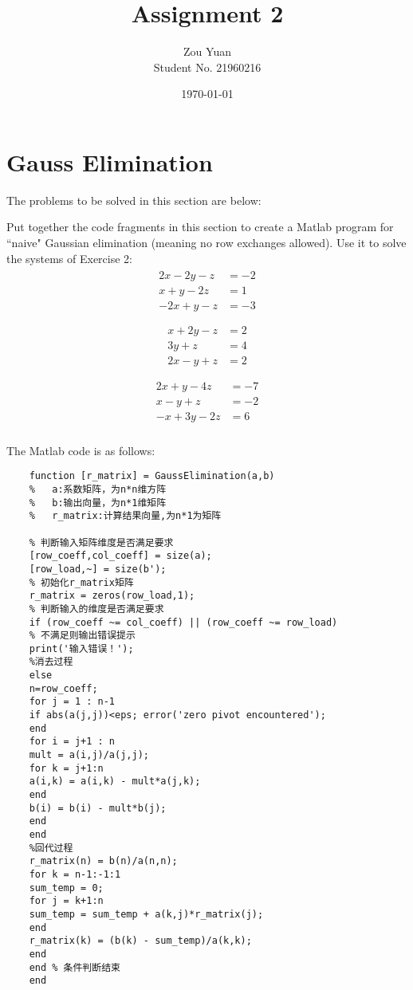 \documentclass[UTF8]{ctexart}
\title{Assignment 2}  %
\author{Zou Yuan\\Student No. 21960216}   %
\date{\today}       %
\begin{document}
	\maketitle
	\section{Gauss Elimination}
	The problems to be solved in this section are below:
	
	Put together the code fragments in this section to create a Matlab program for “naive"
	Gaussian elimination (meaning no row exchanges allowed). Use it to solve the systems of
	Exercise 2:
	\begin{align}
	\begin{split}
	2x − 2y − z &=−2\\
	x + y − 2z &= 1\\
	−2x + y − z &=−3\\
	\end{split}
	\end{align}
	\begin{align}
	\begin{split}
	x + 2y − z &= 2\\
	3y + z &= 4\\
	2x − y + z &= 2\\
	\end{split}
	\end{align}
	\begin{align}
	\begin{split}
	2x + y − 4z &=−7\\
	x − y + z &=−2\\
	−x + 3y − 2z &= 6\\
	\end{split}
	\end{align}
	
	The Matlab code is as follows:
	
	\begin{centering}
	\begin{lstlisting}
	function [r_matrix] = GaussElimination(a,b)
	%   a:系数矩阵，为n*n维方阵
	%   b:输出向量，为n*1维矩阵
	%   r_matrix:计算结果向量,为n*1为矩阵
	
	% 判断输入矩阵维度是否满足要求
	[row_coeff,col_coeff] = size(a);
	[row_load,~] = size(b');
	% 初始化r_matrix矩阵
	r_matrix = zeros(row_load,1);
	% 判断输入的维度是否满足要求
	if (row_coeff ~= col_coeff) || (row_coeff ~= row_load)
	% 不满足则输出错误提示
	print('输入错误！');
	%消去过程
	else
	n=row_coeff;
	for j = 1 : n-1
	if abs(a(j,j))<eps; error('zero pivot encountered'); 
	end
	for i = j+1 : n
	mult = a(i,j)/a(j,j);
	for k = j+1:n
	a(i,k) = a(i,k) - mult*a(j,k);
	end
	b(i) = b(i) - mult*b(j);
	end
	end
	%回代过程
	r_matrix(n) = b(n)/a(n,n);
	for k = n-1:-1:1
	sum_temp = 0;
	for j = k+1:n
	sum_temp = sum_temp + a(k,j)*r_matrix(j);
	end
	r_matrix(k) = (b(k) - sum_temp)/a(k,k);
	end
	end % 条件判断结束
	end
	\end{lstlisting}
		\end{centering}
\end{document}
